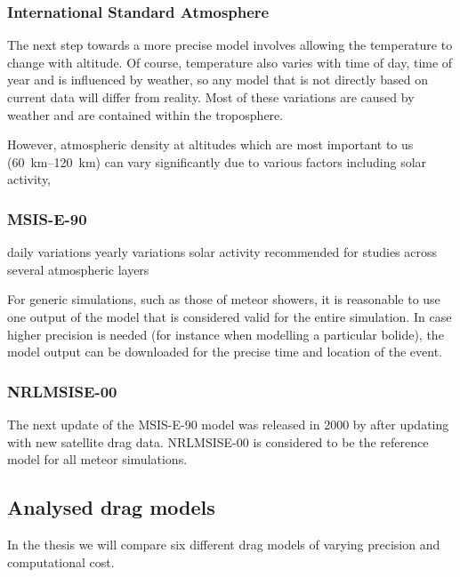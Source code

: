         \subsubsection{International Standard Atmosphere} \label{fddi}
            The next step towards a more precise model involves allowing the temperature to change with altitude.
            Of course, temperature also varies with time of day, time of year and is influenced by weather,
            so any model that is not directly based on current data will differ from reality.
            Most of these variations are caused by weather and are contained within the troposphere.

            However, atmospheric density at altitudes which are most important to us
            (\SIrange{60}{120}{\kilo\metre}) can vary significantly due to various factors including
            solar activity,

        \subsubsection{MSIS-E-90} \label{fdd9}
            daily variations
            yearly variations
            solar activity
            recommended for studies across several atmospheric layers \cite{...}

            For generic simulations, such as those of meteor showers,
            it is reasonable to use one output of the model that is considered valid for the entire simulation.
            In case higher precision is needed (for instance when modelling a particular bolide),
            the model output can be downloaded for the precise time and location of the event.

        \subsubsection{NRLMSISE-00} \label{fdd0}
            The next update of the MSIS-E-90 model was released in 2000 by \citet{picone+nrlmsise00}
            after updating with new satellite drag data. NRLMSISE-00 is considered to be
            the reference model for all meteor simulations.

    \subsection{Analysed drag models} \label{fdm}
        In the thesis we will compare six different drag models of varying precision
        and computational cost.


